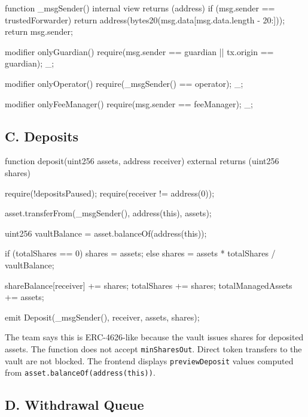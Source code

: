 \begin{codeblock}
function _msgSender() internal view returns (address) {
    if (msg.sender == trustedForwarder) {
        return address(bytes20(msg.data[msg.data.length - 20:]));
    }
    return msg.sender;
}

modifier onlyGuardian() {
    require(msg.sender == guardian || tx.origin == guardian);
    _;
}

modifier onlyOperator() {
    require(_msgSender() == operator);
    _;
}

modifier onlyFeeManager() {
    require(msg.sender == feeManager);
    _;
}
\end{codeblock}

\subsection*{C. Deposits}

\begin{codeblock}
function deposit(uint256 assets, address receiver)
    external
    returns (uint256 shares)
{
    require(!depositsPaused);
    require(receiver != address(0));

    asset.transferFrom(_msgSender(), address(this), assets);

    uint256 vaultBalance = asset.balanceOf(address(this));

    if (totalShares == 0) {
        shares = assets;
    } else {
        shares = assets * totalShares / vaultBalance;
    }

    shareBalance[receiver] += shares;
    totalShares += shares;
    totalManagedAssets += assets;

    emit Deposit(_msgSender(), receiver, assets, shares);
}
\end{codeblock}

The team says this is ERC-4626-like because the vault issues shares for deposited assets. The function does not accept \texttt{minSharesOut}. Direct token transfers to the vault are not blocked. The frontend displays \texttt{previewDeposit} values computed from \texttt{asset.balanceOf(address(this))}.

\subsection*{D. Withdrawal Queue}

